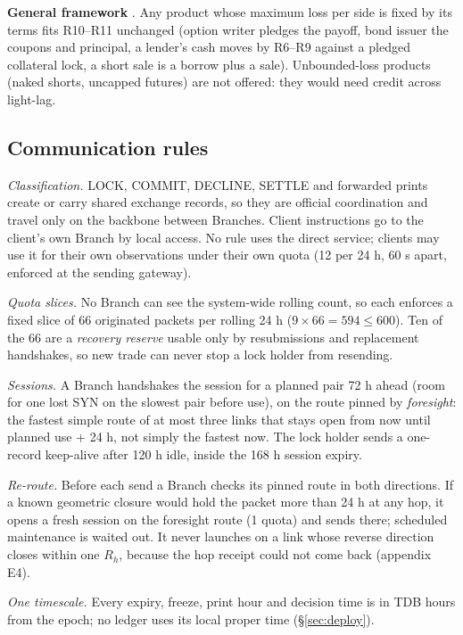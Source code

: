 \textbf{General framework} \extension. Any product whose maximum loss per side is fixed by its terms fits R10--R11 unchanged (option writer pledges the payoff, bond issuer the coupons and principal, a lender's cash moves by R6--R9 against a pledged collateral lock, a short sale is a borrow plus a sale). Unbounded-loss products (naked shorts, uncapped futures) are not offered: they would need credit across light-lag.

\subsection{Communication rules}

\begin{description}[leftmargin=2.2em,style=sameline]
\item[R13] \emph{Classification.} LOCK, COMMIT, DECLINE, SETTLE and forwarded prints create or carry shared exchange
records, so they are official coordination and travel only on the backbone between Branches. Client instructions go
to the client's own Branch by local access. No rule uses the direct service; clients may use it for their own
observations under their own quota (12 per 24 h, 60 s apart, enforced at the sending gateway).
\item[R14] \emph{Quota slices.} No Branch can see the system-wide rolling count, so each enforces a fixed slice of
66 originated packets per rolling 24 h ($9 \times 66 = 594 \le 600$). Ten of the 66 are a \emph{recovery reserve}
usable only by resubmissions and replacement handshakes, so new trade can never stop a lock holder from resending.
\item[R15] \emph{Sessions.} A Branch handshakes the session for a planned pair 72 h ahead (room for one lost SYN on
the slowest pair before use), on the route pinned by \emph{foresight}: the fastest simple route of at most three links
that stays open from now until planned use + 24 h, not simply the fastest now. The lock holder sends a one-record
keep-alive after 120 h idle, inside the 168 h session expiry.
\item[R16] \emph{Re-route.} Before each send a Branch checks its pinned route in both directions. If a known
geometric closure would hold the packet more than 24 h at any hop, it opens a fresh session on the foresight route
(1 quota) and sends there; scheduled maintenance is waited out. It never launches on a link whose reverse direction
closes within one $R_h$, because the hop receipt could not come back (appendix E4).
\item[R17] \emph{One timescale.} Every expiry, freeze, print hour and decision time is in TDB hours from the epoch;
no ledger uses its local proper time (\S\ref{sec:deploy}).
\end{description}
